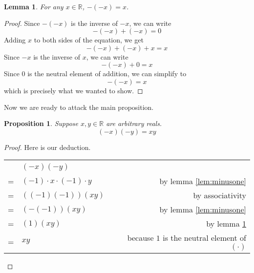 \documentclass[letterpaper,11pt]{article}
\newcommand{\R}{\mathbb{R}}
\newtheorem{prop}{Proposition}
\newtheorem{lemma}{Lemma}
\begin{document}
\begin{lemma}
    For any $x \in \R$, $-(-x) = x$.
    \label{lem:doubleneg}
\end{lemma}

\begin{proof}
    Since $-(-x)$ is the inverse of $-x$, we can write
    \begin{equation*}
        -(-x) + (-x) = 0
    \end{equation*}
    Adding $x$ to both sides of the equation, we get
    \begin{equation*}
        -(-x) + (-x) + x = x
    \end{equation*}
    Since $-x$ is the inverse of $x$, we can write
    \begin{equation*}
        -(-x) + 0 = x
    \end{equation*}
    Since $0$ is the neutral element of addition, we can simplify to
    \begin{equation*}
        -(-x) = x
    \end{equation*}
    which is precisely what we wanted to show.
\end{proof}

Now we are ready to attack the main proposition.

\begin{prop}
    Suppose $x, y \in \R$ are arbitrary reals.
    \begin{equation*}
        (-x)(-y) = xy
    \end{equation*}
\end{prop}

\begin{proof}
    Here is our deduction.

    \begin{center}
        \begin{tabular}{r l | r}
            ~ & $(-x)(-y)$ & ~ \\
            = & $(-1) \cdot x \cdot (-1) \cdot y$
                & by lemma \ref{lem:minusone} \\
            = & $((-1)(-1))(xy)$ & by associativity \\
            = & $(-(-1))(xy)$ & by lemma \ref{lem:minusone} \\
            = & $(1)(xy)$ & by lemma \ref{lem:doubleneg} \\
            = & $xy$ & because $1$ is the neutral element of $(\cdot)$
        \end{tabular}
    \end{center}
\end{proof}
\end{document}
